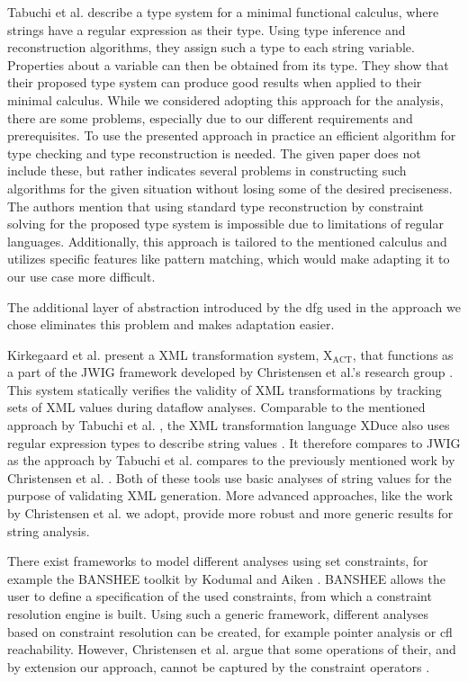 Tabuchi et al. \cite{regex_types} describe a type system for a minimal functional calculus, where strings have a regular expression as their type. Using type inference and reconstruction algorithms, they assign such a type to each string variable. Properties about a variable can then be obtained from its type.
They show that their proposed type system can produce good results when applied to their minimal calculus. While we considered adopting this approach for the analysis, there are some problems, especially due to our different requirements and prerequisites. 
To use the presented approach in practice an efficient algorithm for type checking and type reconstruction is needed. 
The given paper does not include these, but rather indicates several problems in constructing such algorithms for the given situation without losing some of the desired preciseness.
The authors mention that using standard type reconstruction by constraint solving for the proposed type system is impossible due to limitations of regular languages.
Additionally, this approach is tailored to the mentioned calculus and utilizes specific features like pattern matching, which would make adapting it to our use case more difficult.

The additional layer of abstraction introduced by the \ac{dfg} used in the approach we chose eliminates this problem and makes adaptation easier.

Kirkegaard et al. present a XML transformation system, $\text{X}_{\text{ACT}}$, that functions as a part of the JWIG framework developed by Christensen et al.'s research group \cite{xact}. This system statically verifies the validity of XML transformations by tracking sets of XML values during dataflow analyses.
Comparable to the mentioned approach by Tabuchi et al. \cite{regex_types}, the XML transformation language XDuce also uses regular expression types to describe string values \cite{xduce}. It therefore compares to JWIG as the approach by Tabuchi et al. compares to the previously mentioned work by Christensen et al. \cite{brics}. 
Both of these tools use basic analyses of string values for the purpose of validating XML generation. More advanced approaches, like the work by Christensen et al. we adopt, provide more robust and more generic results for string analysis.

There exist frameworks to model different analyses using set constraints, for example the BANSHEE toolkit by Kodumal and Aiken \cite{banshee}. BANSHEE allows the user to define a specification of the used constraints, from which a constraint resolution engine is built. Using such a generic framework, different analyses based on constraint resolution can be created, for example pointer analysis or \ac{cfl} reachability. However, Christensen et al. argue that some operations of their, and by extension our approach, cannot be captured by the constraint operators \cite{brics}.

